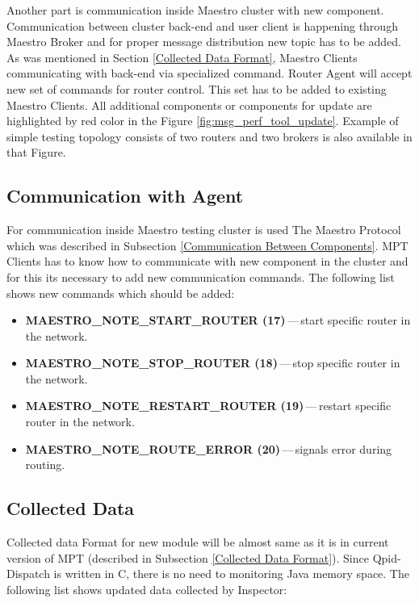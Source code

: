 Another part is communication inside Maestro cluster with new component. Communication between cluster back-end and user client is happening through Maestro Broker and for proper message distribution new topic has to be added. As was mentioned in Section \ref{Collected Data Format}, Maestro Clients communicating with back-end via specialized command. Router Agent will accept new set of commands for router control. This set has to be added to existing Maestro Clients. All additional components or components for update are highlighted by red color in the Figure \ref{fig:msg_perf_tool_update}. Example of simple testing topology consists of two routers and two brokers is also available in that Figure.



\subsection{Communication with Agent}
\label{Communication with Agent}
For communication inside Maestro testing cluster is used The Maestro Protocol which was described in Subsection \ref{Communication Between Components}. MPT Clients has to know how to communicate with new component in the cluster and for this its necessary to add new communication commands. The following list shows new commands which should be added:

\begin{itemize}
	\setlength\itemsep{0em}
	\item \textbf{MAESTRO\_NOTE\_START\_ROUTER (17)}\,---\,start specific router in the network.
	\item \textbf{MAESTRO\_NOTE\_STOP\_ROUTER (18)}\,---\,stop specific router in the network.
	\item \textbf{MAESTRO\_NOTE\_RESTART\_ROUTER (19)}\,---\,restart specific router in the network.
	\item \textbf{MAESTRO\_NOTE\_ROUTE\_ERROR (20)}\,---\,signals error during routing.
\end{itemize}

\subsection{Collected Data}
\label{Collected Data}
Collected data Format for new module will be almost same as it is in current version of MPT (described in Subsection \ref{Collected Data Format}). Since Qpid-Dispatch is written in C, there is no need to monitoring Java memory space. The following list shows updated data collected by Inspector:

